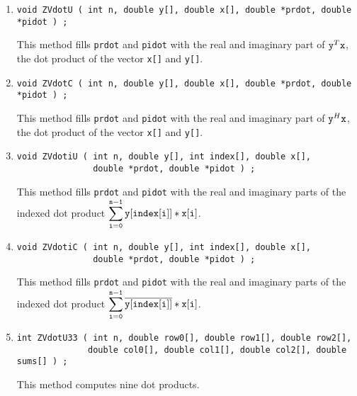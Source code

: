 \begin{enumerate}
\item
\begin{verbatim}
void ZVdotU ( int n, double y[], double x[], double *prdot, double *pidot ) ;
\end{verbatim}
This method fills {\tt *prdot} and {\tt *pidot} with the real and
imaginary part of ${\tt y}^T{\tt x}$,
the dot product of the vector {\tt x[]} and {\tt y[]}.
\item
\begin{verbatim}
void ZVdotC ( int n, double y[], double x[], double *prdot, double *pidot ) ;
\end{verbatim}
This method fills {\tt *prdot} and {\tt *pidot} with the real and
imaginary part of ${\tt y}^H{\tt x}$,
the dot product of the vector {\tt x[]} and {\tt y[]}.
\item
\begin{verbatim}
void ZVdotiU ( int n, double y[], int index[], double x[],
               double *prdot, double *pidot ) ;
\end{verbatim}
This method fills {\tt *prdot} and {\tt *pidot} with the real and
imaginary parts of the indexed dot product 
$\displaystyle \sum_{{\tt i=0}}^{{\tt n-1}} {\tt y[index[i]] * x[i]}$.
\item
\begin{verbatim}
void ZVdotiC ( int n, double y[], int index[], double x[],
               double *prdot, double *pidot ) ;
\end{verbatim}
This method fills {\tt *prdot} and {\tt *pidot} with the real and
imaginary parts of the indexed dot product 
$\displaystyle \sum_{{\tt i=0}}^{{\tt n-1}} 
\overline{\tt y[index[i]]} * {\tt x[i]}$.
\item
\begin{verbatim}
int ZVdotU33 ( int n, double row0[], double row1[], double row2[], 
              double col0[], double col1[], double col2[], double sums[] ) ;
\end{verbatim}
This method computes nine dot products.
\par
{}
\end{enumerate}
